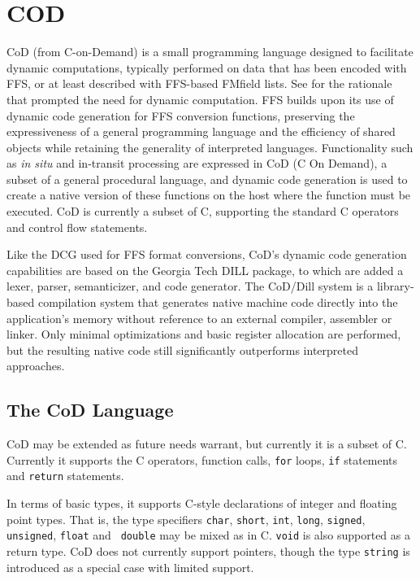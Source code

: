 \section{COD\label{cod}}
CoD (from C-on-Demand) is a small programming language designed to
facilitate dynamic computations, typically performed on data that has
been encoded with FFS, or at least described with FFS-based FMfield
lists.  See \cite{d3} for the rationale that prompted the need for
dynamic computation.  FFS builds upon its use of dynamic code
generation for FFS conversion functions, preserving the expressiveness of a
general programming language and the efficiency of shared objects while
retaining the generality of interpreted languages.  Functionality such as
{\em in situ} and in-transit processing are expressed in CoD (C On Demand), a
subset of a general procedural language, and dynamic code generation is used
to create a native version of these functions on the host where the function
must be executed.  CoD is currently a subset of C, supporting the standard C
operators and control flow statements.

Like the DCG used for FFS format conversions, CoD's dynamic code generation
capabilities are based on the Georgia Tech DILL package, to which are added
a lexer, parser, semanticizer, and code generator.  The CoD/Dill system is a
library-based compilation system that generates native machine code directly
into the application's memory without reference to an external compiler,
assembler or linker.  Only minimal optimizations and basic register
allocation are performed, but the resulting native code still significantly
outperforms interpreted approaches.

\subsection{The CoD Language}
CoD may be extended as future needs warrant, but currently it is a subset
of C.  Currently it supports the C operators, function calls, {\tt for} loops,
{\tt if} statements and {\tt return} statements.  

In terms of basic types, it supports C-style declarations of integer and
floating point types.  That is, the type specifiers  {\tt char}, {\tt short},
{\tt int}, {\tt long}, {\tt signed}, {\tt unsigned}, {\tt float} and {\tt
double} may be mixed as in C.
{\tt void} is also supported as a return type.  CoD does not currently
support pointers, though the type {\tt string} is introduced as a special case
with limited support.

